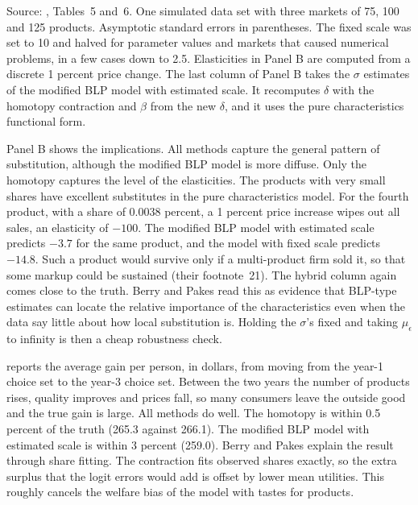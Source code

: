 \begin{table}[htbp]
\smallskip
\begin{minipage}{0.95\textwidth}
\footnotesize Source: \citet{BerryPakes2007}, Tables~5 and~6. One simulated data set with three markets of 75, 100 and 125
products. Asymptotic standard errors in parentheses. The fixed scale was set to 10 and halved for parameter values and
markets that caused numerical problems, in a few cases down to 2.5. Elasticities in Panel B are computed from a discrete
1 percent price change. The last column of Panel B takes the $\sigma$ estimates of the modified BLP model with estimated
scale. It recomputes $\delta$ with the homotopy contraction and $\beta$ from the new $\delta$, and it uses the pure
characteristics functional form.
\end{minipage}
\end{table}

Panel B shows the implications. All methods capture the general pattern of substitution, although the modified BLP
model is more diffuse. Only the homotopy captures the level of the elasticities. The products with very small shares have
excellent substitutes in the pure characteristics model. For the fourth product, with a share of 0.0038 percent, a 1
percent price increase wipes out all sales, an elasticity of $-100$. The modified BLP model with estimated scale predicts
$-3.7$ for the same product, and the model with fixed scale predicts $-14.8$. Such a product would survive only if a
multi-product firm sold it, so that some markup could be sustained (their footnote~21). The hybrid column again comes
close to the truth. Berry and Pakes read this as evidence that BLP-type estimates can locate the relative importance of
the characteristics even when the data say little about how local substitution is. Holding the $\sigma$'s fixed and taking
$\mu_\epsilon$ to infinity is then a cheap robustness check.

 reports the average gain per person, in dollars, from moving from the year-1 choice set to the
year-3 choice set. Between the two years the number of products rises, quality improves and prices fall, so many consumers
leave the outside good and the true gain is large. All methods do well. The homotopy is within 0.5 percent of the truth
(265.3 against 266.1). The modified BLP model with estimated scale is within 3 percent (259.0). Berry and Pakes explain the
result through share fitting. The contraction fits observed shares exactly, so the extra surplus that the logit errors
would add is offset by lower mean utilities. This roughly cancels the welfare bias of the model with tastes for products.

